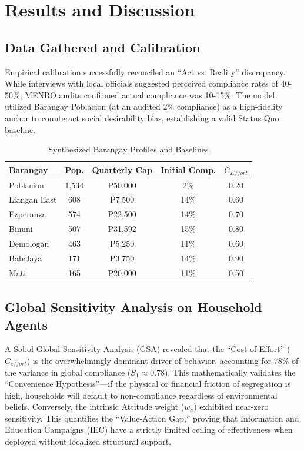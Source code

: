 \documentclass[conference,a4paper]{IEEEtran}
\begin{document}
\section{Results and Discussion}

\subsection{Data Gathered and Calibration}
Empirical calibration successfully reconciled an ``Act vs. Reality'' discrepancy. While interviews with local officials suggested perceived compliance rates of 40-50\%, MENRO audits confirmed actual compliance was 10-15\%. The model utilized Barangay Poblacion (at an audited 2\% compliance) as a high-fidelity anchor to counteract social desirability bias, establishing a valid Status Quo baseline.

\begin{table}[htbp]
\caption{Synthesized Barangay Profiles and Baselines}
\begin{center}
\begin{tabular}{lcccc}
\toprule
\textbf{Barangay} & \textbf{Pop.} & \textbf{Quarterly Cap} & \textbf{Initial Comp.} & \textbf{$C_{Effort}$} \\
\midrule
Poblacion & 1,534 & P50,000 & 2\% & 0.20 \\
Liangan East & 608 & P7,500 & 14\% & 0.60 \\
Ezperanza & 574 & P22,500 & 14\% & 0.70 \\
Binuni & 507 & P31,592 & 15\% & 0.80 \\
Demologan & 463 & P5,250 & 11\% & 0.60 \\
Babalaya & 171 & P3,750 & 14\% & 0.90 \\
Mati & 165 & P20,000 & 11\% & 0.50 \\
\bottomrule
\end{tabular}
\label{tab:profiles}
\end{center}
\end{table}

\subsection{Global Sensitivity Analysis on Household Agents}
A Sobol Global Sensitivity Analysis (GSA) revealed that the ``Cost of Effort'' ($C_{effort}$) is the overwhelmingly dominant driver of behavior, accounting for 78\% of the variance in global compliance ($S_1 \approx 0.78$). This mathematically validates the ``Convenience Hypothesis''—if the physical or financial friction of segregation is high, households will default to non-compliance regardless of environmental beliefs. Conversely, the intrinsic Attitude weight ($w_a$) exhibited near-zero sensitivity. This quantifies the ``Value-Action Gap,'' proving that Information and Education Campaigns (IEC) have a strictly limited ceiling of effectiveness when deployed without localized structural support.
\end{document}
